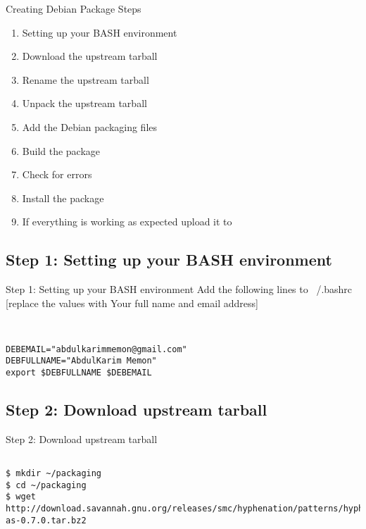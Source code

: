 \documentclass[red,10pt,a4paper]{beamer}
\begin{document}
\begin{frame}{Creating Debian Package Steps}
\begin{enumerate}
	\item Setting up your BASH environment
	\item Download the upstream tarball
	\item Rename the upstream tarball
	\item Unpack the upstream tarball
	\item Add the Debian packaging files
	\item Build the package
	\item Check for errors
	\item Install the package
	\item If everything is working as expected upload it to 
\end{enumerate}

\end{frame}

\subsection{Step 1: Setting up your BASH environment}

\begin{frame}[fragile]{Step 1: Setting up your BASH environment}
\lstset{breaklines=true}
\lstset{makemacrouse=true}
Add the following lines to ~/.bashrc
[replace the values with Your full name and email address]
\begin{lstlisting}


DEBEMAIL="abdulkarimmemon@gmail.com"
DEBFULLNAME="AbdulKarim Memon"
export $DEBFULLNAME $DEBEMAIL
    \end{lstlisting} 
\end{frame}


\subsection{Step 2: Download upstream tarball}

\begin{frame}[fragile]{Step 2: Download upstream tarball}
\lstset{breaklines=true}
\lstset{makemacrouse=true}
\begin{lstlisting}

$ mkdir ~/packaging
$ cd ~/packaging
$ wget http://download.savannah.gnu.org/releases/smc/hyphenation/patterns/hyphen-as-0.7.0.tar.bz2
    \end{lstlisting} 
\end{frame}
\end{document}

